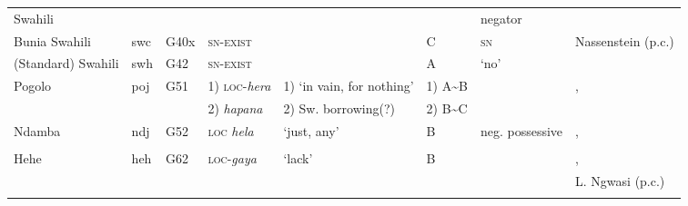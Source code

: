 \documentclass[output=paper,draft,draftmode,colorlinks,citecolor=brown]{langscibook}
\begin{document}
\begin{paperappendix}
\begin{sidewaystable}
\begin{tabularx}{\textwidth}{llllllQQ}
{Swahili}	&				&				&				&										&		&negator\\
{Bunia Swahili}&{swc}	&{G40x}	&\textsc{sn-exist}&\textendash								&C 		&\textsc{sn}										&Nassenstein (p.c.)\\
{(Standard) Swahili}&{swh}&{G42}&\textsc{sn-exist}&\textendash							&A{}	&`no' 											&\citet{Marten2013}\\
{Pogolo}	&{poj}	&{G51}	&1) \textsc{loc}-\textit{hera}&1) `in vain, for nothing'		&1) A{\textasciitilde}B&									&\citet{Nurse2007},\\
				&				&				&2) \textit{hapana}&2) Sw. borrowing(?)					&2) B{\textasciitilde}C&									&\citet{Hendle1907}\\
{Ndamba} &{ndj}		&{G52} 	&\textsc{loc} \textit{hela}&`just, any'						&B{}	&neg. possessive 									&\citet{Novotna2005},\\
				&				&				&				&										&		&												&\citet{EdelstenLijongwa2010}\\
{Hehe}	&{heh}	&{G62}	&\textsc{loc}-\textit{gaya}&`lack'							&B{}	&												&\citet{Velten1899},\\
				&				&				&				&										&		&												&L. Ngwasi (p.c.)\\
\lspbottomrule
\end{tabularx}
\end{sidewaystable}


\end{paperappendix}
\end{document}
